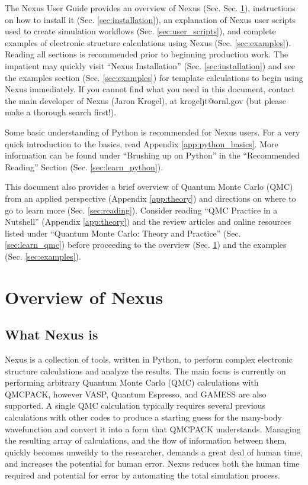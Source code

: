 \documentclass[oneside,11pt]{memoir}
\numberwithin{equation}{section}
\begin{document}
The Nexus User Guide provides an overview of Nexus (Sec. Sec. \ref{sec:overview}), instructions on how to install it (Sec. \ref{sec:installation}), an explanation of Nexus user scripts used to create simulation workflows (Sec. \ref{sec:user_scripts}), and complete examples of electronic structure calculations using Nexus (Sec. \ref{sec:examples}).  Reading all sections is recommended prior to beginning production work.  The impatient may quickly visit ``Nexus Installation'' (Sec. \ref{sec:installation}) and see the examples section (Sec. \ref{sec:examples}) for template calculations to begin using Nexus immediately. If you cannot find what you need in this document, contact the main developer of Nexus (Jaron Krogel), at krogeljt@ornl.gov (but please make a thorough search first!).

Some basic understanding of Python is recommended for Nexus users.  For a very quick introduction to the basics, read Appendix \ref{app:python_basics}.  More information can be found under ``Brushing up on Python'' in the ``Recommended Reading'' Section (Sec. \ref{sec:learn_python}).

This document also provides a brief overview of Quantum Monte Carlo (QMC) from an applied perspective (Appendix \ref{app:theory}) and directions on where to go to learn more (Sec. \ref{sec:reading}).  Consider reading ``QMC Practice in a Nutshell'' (Appendix \ref{app:theory}) and the review articles and online resources listed under ``Quantum Monte Carlo: Theory and Practice'' (Sec. \ref{sec:learn_qmc}) before proceeding to the overview (Sec. \ref{sec:overview}) and the examples (Sec. \ref{sec:examples}).  




\pagebreak
\chapter{Overview of Nexus} \label{sec:overview}
\section{What Nexus is}
Nexus is a collection of tools, written in Python, to perform 
complex electronic structure calculations and analyze the results.  The main 
focus is currently on performing arbitrary Quantum Monte Carlo (QMC) 
calculations with QMCPACK, however VASP, Quantum Espresso, and GAMESS are
also supported.  A single QMC calculation typically requires several 
previous calculations with other codes to produce a starting guess for the 
many-body wavefunction and convert it into a form that QMCPACK understands.  
Managing the resulting array of calculations, and the flow of information 
between them, quickly becomes unweildy to the researcher, demands a great 
deal of human time, and increases the potential for human error.  Nexus 
reduces both the human time required and potential for error by 
automating the total simulation process.  
\end{document}

